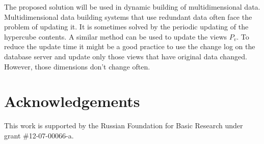 \documentclass{article}
\begin{document}
The proposed solution will be used in dynamic building of multidimensional data.
Multidimensional data building systems that use redundant data often face the
problem of updating it. It is sometimes solved by the periodic updating of the
hypercube contents.
A similar method can be used to update the views $P_v$. To reduce the update
time it might be a good practice to use the change log on the database server
and update only those views that have original data changed. However, those
dimensions don't change often.

\section{Acknowledgements}
This work is supported by the Russian Foundation for Basic Research under
grant \#12-07-00066-a.
\end{document}
